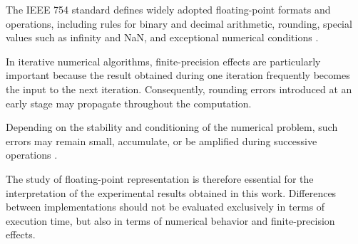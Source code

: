 The IEEE 754 standard defines widely adopted floating-point formats and
operations, including rules for binary and decimal arithmetic, rounding,
special values such as infinity and NaN, and exceptional numerical conditions
\cite{ieee7542019}.

In iterative numerical algorithms, finite-precision effects are particularly
important because the result obtained during one iteration frequently becomes
the input to the next iteration. Consequently, rounding errors introduced at
an early stage may propagate throughout the computation.

Depending on the stability and conditioning of the numerical problem, such
errors may remain small, accumulate, or be amplified during successive
operations
\cite{higham2002accuracy}.

The study of floating-point representation is therefore essential for the
interpretation of the experimental results obtained in this work. Differences
between implementations should not be evaluated exclusively in terms of
execution time, but also in terms of numerical behavior and finite-precision
effects.
